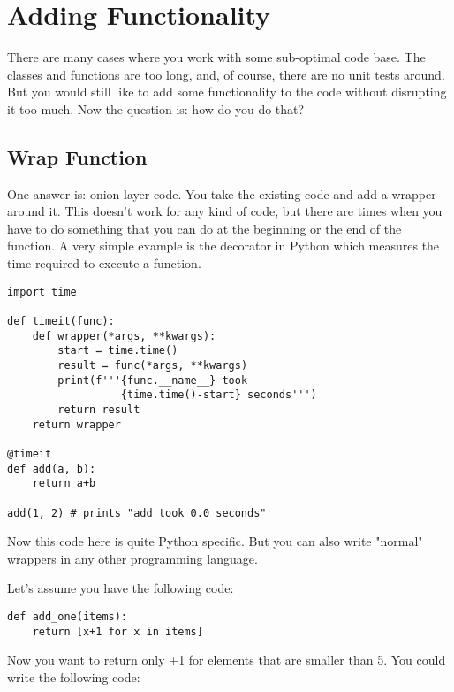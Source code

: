 \chapter{Adding Functionality}

There are many cases where you work with some sub-optimal code base. The classes and functions are too long, and, of course, there are no unit tests around. But you would still like to add some functionality to the code without disrupting it too much. Now the question is: how do you do that?

\section{Wrap Function}

One answer is: onion layer code. You take the existing code and add a wrapper around it. This doesn't work for any kind of code, but there are times when you have to do something that you can do at the beginning or the end of the function. A very simple example is the \code{\@timeit} decorator in Python which measures the time required to execute a function.

\begin{programcode}{}
\begin{verbatim}
import time

def timeit(func):
    def wrapper(*args, **kwargs):
        start = time.time()
        result = func(*args, **kwargs)
        print(f'''{func.__name__} took 
                  {time.time()-start} seconds''')
        return result
    return wrapper
    
@timeit
def add(a, b):
    return a+b

add(1, 2) # prints "add took 0.0 seconds"
\end{verbatim}
\end{programcode}

Now this code here is quite Python specific. But you can also write "normal" wrappers in any other programming language.

Let's assume you have the following code:

\begin{programcode}{}
\begin{verbatim}
def add_one(items):
    return [x+1 for x in items]
\end{verbatim}
\end{programcode}

Now you want to return only +1 for elements that are smaller than 5. You could write the following code:

